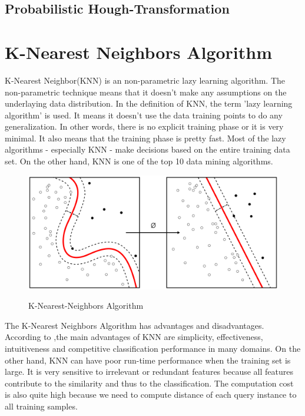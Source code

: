 %
\subsection{Probabilistic Hough-Transformation}\label{sec:Probabilistic Hough-Transformation}
%




%
\section{K-Nearest Neighbors Algorithm}\label{sec:K-Nearest Neighbors Algorithm}
%
K-Nearest Neighbor(KNN) is an non-parametric lazy learning algorithm. The non-parametric technique means that it doesn't make any assumptions on the underlaying data distribution. In the definition of KNN, the term 'lazy learning algorithm' is used. It means it doesn't use the data training points to do any generalization. In other words, there is no explicit training phase or it is very minimal.  It also means that the training phase is pretty fast. Most of the lazy algorithms - especially KNN - make decisions based on the entire training data set. On the other hand, KNN is one of the top 10 data mining algorithms\cite{k_nearest_neighbors}.

\begin{figure}[H]
 \centering
  \includegraphics[width=1\textwidth]{./Bilder/k-nearest-neighbors.png}\label{Procedures_of_IPM}
  \caption{K-Nearest-Neighbors Algorithm\cite{k_nearest_neighbors_wikipedia}}
\end{figure}

The K-Nearest Neighbors Algorithm has advantages and disadvantages. According to \cite{k_nearest_neighbors_adv_disadv},the main advantages of KNN are simplicity, effectiveness, intuitiveness and competitive classification performance in many domains. On the other hand, KNN can have poor run-time performance when the training set is large. It is very sensitive to irrelevant or redundant features because all features contribute to the similarity and thus to the classification. The computation cost is also quite high because we need to compute distance of each query instance to all training samples. 

